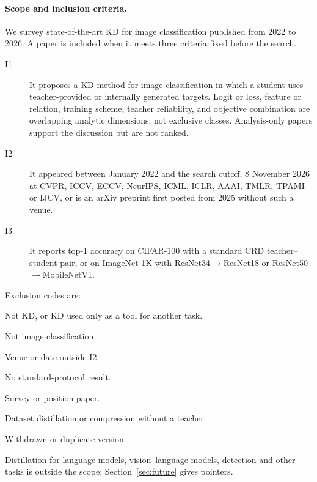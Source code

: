 \paragraph{Scope and inclusion criteria.} We survey state-of-the-art KD for image classification published
from 2022 to 2026. A paper is included when it meets three criteria fixed before the search. \begin{description}
\item[ I1 ] It proposes a KD method for image classification in which a student uses teacher-provided or internally generated targets. Logit or loss, feature or relation, training scheme, teacher reliability, and objective combination are overlapping analytic dimensions, not exclusive classes. Analysis-only papers support the discussion but are not ranked.
\item[ I2 ] It appeared between January 2022 and the search cutoff, 8 November 2026 at CVPR, ICCV, ECCV, NeurIPS, ICML, ICLR, AAAI, TMLR, TPAMI or IJCV, or is an arXiv preprint first posted from 2025 without such a venue.
\item[ I3 ] It reports top-1 accuracy on CIFAR-100 with a standard CRD teacher--student pair, or on ImageNet-1K with ResNet34$\to$ResNet18 or ResNet50$\to$MobileNetV1.
\end{description}
Exclusion codes are:
\begin{description}
\setlength{\itemsep}{0pt}
\item[E1] Not KD, or KD used only as a tool for another task.
\item[E2] Not image classification.
\item[E3] Venue or date outside I2.
\item[E4] No standard-protocol result.
\item[E5] Survey or position paper.
\item[E6] Dataset distillation or compression without a teacher.
\item[E7] Withdrawn or duplicate version.
\end{description}
Distillation for language models, vision--language models,
detection and other tasks is outside the scope; Section~\ref{sec:future} gives pointers.

